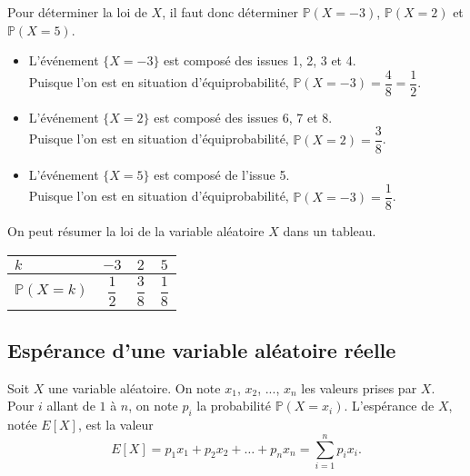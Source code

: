 \documentclass[11pt,fleqn, openany]{book} %
\begin{document}
\begin{example}
Pour déterminer la loi de $X$, il faut donc déterminer $\mathbb{P}(X=-3)$, $\mathbb{P}(X=2)$ et $\mathbb{P}(X=5)$.
\begin{itemize}
\item L'événement $\{X=-3\}$ est composé des issues 1, 2, 3 et 4. \\ Puisque l'on est en situation d'équiprobabilité, $\mathbb{P}(X=-3)=\dfrac{4}{8}=\dfrac{1}{2}$.
\vskip5pt
\item L'événement $\{X=2\}$ est composé des issues 6, 7 et 8. \\ Puisque l'on est en situation d'équiprobabilité, $\mathbb{P}(X=2)=\dfrac{3}{8}$.
\vskip5pt
\item L'événement $\{X=5\}$ est composé de l'issue 5. \\ Puisque l'on est en situation d'équiprobabilité, $\mathbb{P}(X=-3)=\dfrac{1}{8}$.
\end{itemize}
On peut résumer la loi de la variable aléatoire $X$ dans un tableau.
\renewcommand{\arraystretch}{2.2}
\begin{center}
\begin{tabular}{|l|c|c|c|}
\hline
$k$ & $-3$ & $2$ & $5$ \\
\hline
$\mathbb{P}(X=k)$ & $\dfrac{1}{2}$ & $\dfrac{3}{8}$ & $\dfrac{1}{8}$ \\
\hline \end{tabular}
\end{center}
\end{example}


\subsection{Espérance d'une variable aléatoire réelle}

\begin{definition}Soit $X$ une variable aléatoire. On note $x_1$, $x_2$, ..., $x_n$ les valeurs prises par $X$.\\
Pour $i$ allant de $1$ à $n$, on note $p_i$ la probabilité $\mathbb{P}(X=x_i)$. L'espérance de $X$, notée $E[X]$, est la valeur
\[ E[X]= p_1x_1+p_2x_2+\ldots + p_n x_n = \sum _{i=1}^{n} p_i x_i.\]\end{definition}
\end{document}
